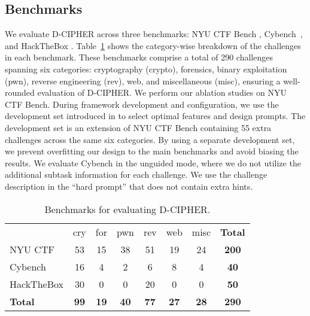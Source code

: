 \subsection{Benchmarks}
We evaluate D-CIPHER across three benchmarks: NYU CTF Bench \cite{shao2024nyu}, Cybench~\cite{zhang2024cybenchframeworkevaluatingcybersecurity}, and HackTheBox \cite{hackthebox}. Table~\ref{table:benchmarks} shows the category-wise breakdown of the challenges in each benchmark. These benchmarks comprise a total of 290 challenges spanning six categories: cryptography (crypto), forensics, binary exploitation (pwn), reverse engineering (rev), web, and miscellaneous (misc), ensuring a well-rounded evaluation of D-CIPHER. We perform our ablation studies on NYU CTF Bench.
During framework development and configuration, we use the development set introduced in \cite{abramovich2024enigma} to select optimal features and design prompts.
The development set is an extension of NYU CTF Bench containing 55 extra challenges across the same six categories.
By using a separate development set, we prevent overfitting our design to the main benchmarks and avoid biasing the results.
We evaluate Cybench in the unguided mode, where we do not utilize the additional subtask information for each challenge. We use the challenge description in the ``hard prompt'' that does not contain extra hints.

\begin{table}[htpb]
\centering
\caption{Benchmarks for evaluating D-CIPHER.}
\label{table:benchmarks}
\begin{tabular}{lccccccc}
\toprule
                   & cry      & for   & pwn         & rev         & web        & misc         & \textbf{Total} \\ 
\cmidrule{2-8}
NYU CTF            & 53          & 15          & 38          & 51          & 19          & 24          & \textbf{200}   \\
Cybench            & 16          & 4           & 2           & 6           & 8           & 4           & \textbf{40}    \\ 
HackTheBox         & 30          & 0           & 0           & 20          & 0           & 0           & \textbf{50}    \\
\midrule
\textbf{Total}     & \textbf{99} & \textbf{19} & \textbf{40} & \textbf{77} & \textbf{27} & \textbf{28} & \textbf{290}   \\ 
\bottomrule
\end{tabular}
\end{table}



